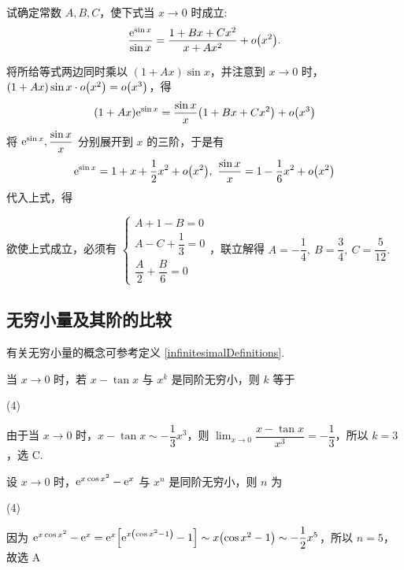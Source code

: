 \begin{example}
    试确定常数 $A,B,C$，使下式当 $x\to0 $ 时成立:
    $$\dfrac{\mathrm{e}^{\sin x}}{\sin x}=\dfrac{1+Bx+Cx^2}{x+Ax^2}+o\qty(x^2).$$
\end{example}
\begin{solution}
    将所给等式两边同时乘以 $(1+Ax)\sin x$，并注意到 $x\to0$ 时，$(1+Ax)\sin x\cdot o\qty(x^2)=o\qty(x^3)$，得
    $$(1+Ax)\mathrm{e}^{\sin x}=\dfrac{\sin x}{x}\qty(1+Bx+Cx^2)+o\qty(x^3)$$
    将 $\mathrm{e}^{\sin x},\dfrac{\sin x}{x}$ 分别展开到 $x$ 的三阶，于是有
    $$\mathrm{e}^{\sin x}=1+x+\dfrac{1}{2}x^2+o\qty(x^2),~\dfrac{\sin x}{x}=1-\dfrac{1}{6}x^2+o\qty(x^2)$$
    代入上式，得
    欲使上式成立，必须有 $\begin{cases}
            A+1-B=0 \\[6pt]A-C+\dfrac{1}{3}=0\\[6pt]\dfrac{A}{2}+\dfrac{B}{6}=0
        \end{cases}$，联立解得 $A=-\dfrac{1}{4},~B=\dfrac{3}{4},~C=\dfrac{5}{12}.$
\end{solution}

\subsection{无穷小量及其阶的比较}

有关无穷小量的概念可参考定义 \ref{infinitesimalDefinitions}.

\begin{example}[2019 数一]
    当 $x\to0$ 时，若 $x-\tan x$ 与 $x^{k}$ 是同阶无穷小，则 $k$ 等于 
    \begin{tasks}(4)
    \end{tasks}
\end{example}
\begin{solution}
    由于当 $x\to0$ 时，$x-\tan x\sim-\dfrac{1}{3}x^3$，则 $\displaystyle\lim_{x\to0}\dfrac{x-\tan x}{x^3}=-\dfrac{1}{3}$，所以 $k=3$，选 C.
\end{solution}

\begin{example}
    设 $x\to0$ 时，$\mathrm{e} ^{x\cos x^2}-\mathrm{e} ^{x}$ 与 $x^n$ 是同阶无穷小，则 $n $ 为
    \begin{tasks}(4)
    \end{tasks}
\end{example}
\begin{solution}
    因为 $\mathrm{e} ^{x\cos x^2}-\mathrm{e} ^{x}=\mathrm{e}^x\qty[\mathrm{e} ^{x\qty(\cos x^2-1)}-1]\sim x\qty(\cos x^2-1)\sim -\dfrac{1}{2}x^5$，所以 $n=5$，故选 A
\end{solution}

